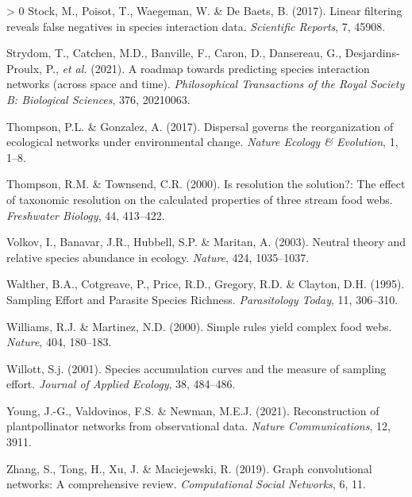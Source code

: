 \documentclass[11pt]{article}
\newlength{\cslhangindent}
\newenvironment{CSLReferences}[3] %
 {%
  \setlength{\parindent}{0pt}
  \ifodd #1 \everypar{\setlength{\hangindent}{\cslhangindent}}\ignorespaces\fi
  \ifnum #2 > 0
  \setlength{\parskip}{#2\baselineskip}
  \fi
 }%
 {}
\begin{document}
\begin{CSLReferences}{1}{0}
\leavevmode\hypertarget{ref-Stock2017LinFil}{}%
Stock, M., Poisot, T., Waegeman, W. \& De Baets, B. (2017). Linear
filtering reveals false negatives in species interaction data.
\emph{Scientific Reports}, 7, 45908.

\leavevmode\hypertarget{ref-Strydom2021RoaPre}{}%
Strydom, T., Catchen, M.D., Banville, F., Caron, D., Dansereau, G.,
Desjardins-Proulx, P., \emph{et al.} (2021). A roadmap towards
predicting species interaction networks (across space and time).
\emph{Philosophical Transactions of the Royal Society B: Biological
Sciences}, 376, 20210063.

\leavevmode\hypertarget{ref-Thompson2017DisGov}{}%
Thompson, P.L. \& Gonzalez, A. (2017). Dispersal governs the
reorganization of ecological networks under environmental change.
\emph{Nature Ecology \& Evolution}, 1, 1--8.

\leavevmode\hypertarget{ref-Thompson2000ResSol}{}%
Thompson, R.M. \& Townsend, C.R. (2000). Is resolution the solution?:
The effect of taxonomic resolution on the calculated properties of three
stream food webs. \emph{Freshwater Biology}, 44, 413--422.

\leavevmode\hypertarget{ref-Volkov2003NeuThe}{}%
Volkov, I., Banavar, J.R., Hubbell, S.P. \& Maritan, A. (2003). Neutral
theory and relative species abundance in ecology. \emph{Nature}, 424,
1035--1037.

\leavevmode\hypertarget{ref-Walther1995SamEff}{}%
Walther, B.A., Cotgreave, P., Price, R.D., Gregory, R.D. \& Clayton,
D.H. (1995). Sampling Effort and Parasite Species Richness.
\emph{Parasitology Today}, 11, 306--310.

\leavevmode\hypertarget{ref-Williams2000SimRul}{}%
Williams, R.J. \& Martinez, N.D. (2000). Simple rules yield complex food
webs. \emph{Nature}, 404, 180--183.

\leavevmode\hypertarget{ref-Willott2001SpeAcc}{}%
Willott, S.j. (2001). Species accumulation curves and the measure of
sampling effort. \emph{Journal of Applied Ecology}, 38, 484--486.

\leavevmode\hypertarget{ref-Young2021RecPla}{}%
Young, J.-G., Valdovinos, F.S. \& Newman, M.E.J. (2021). Reconstruction
of plantpollinator networks from observational data. \emph{Nature
Communications}, 12, 3911.

\leavevmode\hypertarget{ref-Zhang2019GraCon}{}%
Zhang, S., Tong, H., Xu, J. \& Maciejewski, R. (2019). Graph
convolutional networks: A comprehensive review. \emph{Computational
Social Networks}, 6, 11.

\end{CSLReferences}
\end{document}
